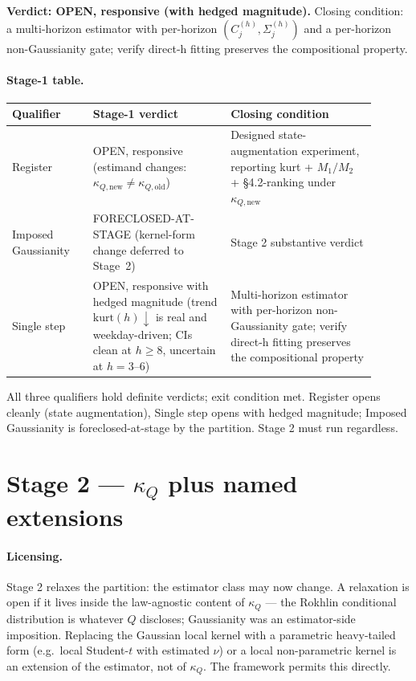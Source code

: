 \documentclass[11pt]{article}
\newcommand{\kQ}{\kappa_{Q}}
\begin{document}
\textbf{Verdict: OPEN, responsive (with hedged magnitude).} Closing
condition: a multi-horizon estimator with per-horizon
\((C_j^{(h)}, \Sigma_j^{(h)})\) and a per-horizon non-Gaussianity
gate; verify direct-h fitting preserves the compositional property.

\paragraph{Stage-1 table.}
\begin{center}\small
\begin{tabular}{P{0.20\linewidth} P{0.34\linewidth} P{0.36\linewidth}}
\toprule
Qualifier & Stage-1 verdict & Closing condition \\
\midrule
Register
& OPEN, responsive (estimand changes: \(\kappa_{Q,\mathrm{new}} \neq \kappa_{Q,\mathrm{old}}\))
& Designed state-augmentation experiment, reporting kurt + \(M_1/M_2\)
+ \S4.2-ranking under \(\kappa_{Q,\mathrm{new}}\) \\
\midrule
Imposed Gaussianity
& FORECLOSED-AT-STAGE (kernel-form change deferred to Stage~2)
& Stage 2 substantive verdict \\
\midrule
Single step
& OPEN, responsive with hedged magnitude (trend
\(\mathrm{kurt}(h){\downarrow}\) is real and weekday-driven; CIs
clean at \(h{\geq}8\), uncertain at \(h = 3\)--\(6\))
& Multi-horizon estimator with per-horizon non-Gaussianity gate;
verify direct-h fitting preserves the compositional property \\
\bottomrule
\end{tabular}
\end{center}

All three qualifiers hold definite verdicts; exit condition met.
Register opens cleanly (state augmentation), Single step opens with
hedged magnitude; Imposed Gaussianity is foreclosed-at-stage by the
partition. Stage 2 must run regardless.

\section{Stage 2 --- \(\kQ\) plus named extensions}
\label{sec:stage2}

\paragraph{Licensing.} Stage 2 relaxes the partition: the estimator
class may now change. A relaxation is open if it lives inside the
law-agnostic content of \(\kQ\) --- the Rokhlin conditional
distribution is whatever \(Q\) discloses; Gaussianity was an
estimator-side imposition. Replacing the Gaussian local kernel with
a parametric heavy-tailed form (e.g.\ local Student-\(t\) with
estimated \(\nu\)) or a local non-parametric kernel is an extension
of the estimator, not of \(\kQ\). The framework permits this
directly.
\end{document}
